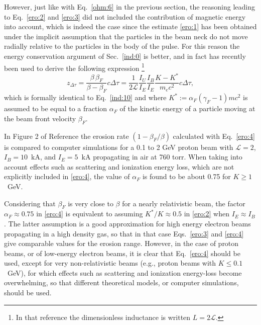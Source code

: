 \documentclass [12pt,a4paper,     ]{report} %
\newcommand{\DEF}{:=}                 %
\begin{document}
   However, just like with Eq.~\eqref{ohm:6} in the previous section, the reasoning leading to Eq.~\eqref{ero:2} and \eqref{ero:3} did not included the contribution of magnetic energy into account, which is indeed the case since the estimate \eqref{ero:1} has been obtained under the implicit assumption that the particles in the beam neck do not move radially relative to the particles in the body of the pulse.  For this reason the energy conservation argument of Sec.~\ref{ind:0} is better, and in fact has recently been used to derive the following expression \cite{ROSE-2002-}\footnote{In that reference the dimensionless inductance is written $L=2\mathcal{L}$.}
%
\begin{equation}\label{ero:4} %
       z_{\Delta \tau} = \frac{\beta \, \beta_F}{\beta - \beta_F} c\Delta \tau
                       = \frac{1}{2\mathcal{L}}
                         \frac{I_U}{I_E}
                         \frac{I_B}{I_E}
                         \frac{K-K^*}{m_ec^2} c\Delta \tau,
\end{equation}
%
which is formally identical to Eq.~\eqref{ind:10} and where $K^*\DEF\alpha_F (\gamma_F -1) mc^2$ is assumed to be equal to a fraction $\alpha_F$ of the kinetic energy of a particle moving at the beam front velocity $\beta_F$.

     In Figure 2 of Reference \cite{ROSE-2002-} the erosion rate $(1- \beta_F/\beta)$ calculated with Eq.~\eqref{ero:4} is compared to computer simulations for a 0.1 to 2 GeV proton beam with $\mathcal{L}=2$, $I_B=10$~kA, and $I_E=5$~kA propagating in air at 760 torr.  When taking into account effects such as scattering and ionization energy loss, which are not explicitly included in \eqref{ero:4}, the value of $\alpha_F$ is found to be about 0.75 for $K \geq 1$~GeV.

   Considering that $\beta_F$ is very close to $\beta$ for a nearly relativistic beam, the factor $\alpha_F \approx 0.75$ in \eqref{ero:4} is equivalent to assuming $K^*/K \approx 0.5$ in \eqref{ero:2} when $I_E \approx  I_B$.  The latter assumption is a good approximation for high energy electron beams propagating in a high density gas, so that in that case Eqs.~\eqref{ero:3} and \eqref{ero:4} give comparable values for the erosion range.  However, in the case of proton beams, or of low-energy electron beams,  it is clear that Eq.~\eqref{ero:4} should be used, except for very non-relativistic beams (e.g., proton beams with $K \leq 0.1$~GeV), for which effects such as scattering and ionization energy-loss become overwhelming, so that different theoretical models, or computer simulations, should be used. 
\end{document}
